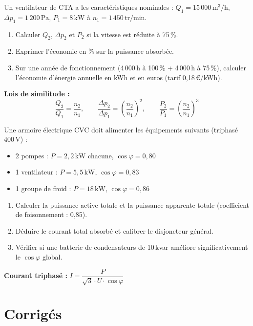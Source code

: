 
Un ventilateur de CTA a les caractéristiques nominales : $Q_1 = 15\,000\,\text{m}^3/\text{h}$, $\Delta p_1 = 1\,200\,\text{Pa}$, $P_1 = 8\,\text{kW}$ à $n_1 = 1\,450\,\text{tr/min}$.

\begin{enumerate}
  \item Calculer $Q_2$, $\Delta p_2$ et $P_2$ si la vitesse est réduite à 75\,\%.
  \item Exprimer l'économie en \% sur la puissance absorbée.
  \item Sur une année de fonctionnement (4\,000\,h à 100\,\% + 4\,000\,h à 75\,\%), calculer l'économie d'énergie annuelle en kWh et en euros (tarif 0,18\,€/kWh).
\end{enumerate}

\textbf{Lois de similitude :}
\[
  \frac{Q_2}{Q_1} = \frac{n_2}{n_1}, \qquad \frac{\Delta p_2}{\Delta p_1} = \left(\frac{n_2}{n_1}\right)^2, \qquad \frac{P_2}{P_1} = \left(\frac{n_2}{n_1}\right)^3
\]


Une armoire électrique CVC doit alimenter les équipements suivants (triphasé 400\,V) :
\begin{itemize}
  \item 2 pompes : $P = 2{,}2\,\text{kW}$ chacune, $\cos\varphi = 0{,}80$
  \item 1 ventilateur : $P = 5{,}5\,\text{kW}$, $\cos\varphi = 0{,}83$
  \item 1 groupe de froid : $P = 18\,\text{kW}$, $\cos\varphi = 0{,}86$
\end{itemize}

\begin{enumerate}
  \item Calculer la puissance active totale et la puissance apparente totale (coefficient de foisonnement : 0,85).
  \item Déduire le courant total absorbé et calibrer le disjoncteur général.
  \item Vérifier si une batterie de condensateurs de 10\,kvar améliore significativement le $\cos\varphi$ global.
\end{enumerate}

\textbf{Courant triphasé :} $I = \dfrac{P}{\sqrt{3} \cdot U \cdot \cos\varphi}$

\newpage
\section*{Corrigés}

